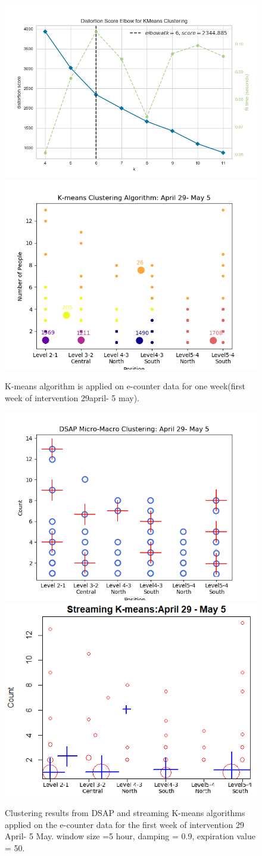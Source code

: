     
\begin{figure}[!h]
    \centering
    \includegraphics[width=.5\textwidth]{image/Chapters/Chapter6/elbow.png}%
    \includegraphics[width=.5\textwidth]{image/Chapters/Chapter6/kmeans1WeekDuring.png}%
    \caption{K-means algorithm is applied on e-counter data for one week(first week of intervention 29april- 5 may).}
    \label{elbkmean}
\end{figure}    






\begin{figure}[]
    \centering
    \includegraphics[width=.49\textwidth]{image/Chapters/Chapter6/during3hour-samp 9.preference 1.No Thre.png}
    \includegraphics[width=.49\textwidth]{image/Chapters/Chapter6/StreamKDuring.png}
    \caption{Clustering results from DSAP and streaming K-means algorithms applied on the e-counter data for the first week of intervention 29 April- 5 May. window size =5 hour, damping = 0.9, expiration value = 50.}
    \label{6}
\end{figure}



